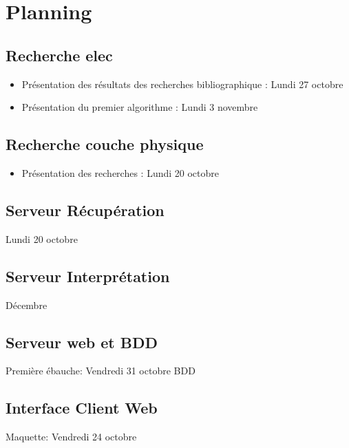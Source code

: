 \documentclass[10pt,a4paper]{article}
\begin{document}
\newpage
\section{Planning}
\subsection{Recherche elec}
\begin{itemize}
	\item Présentation des résultats des recherches bibliographique : Lundi 27 octobre
	\item Présentation du premier algorithme : Lundi 3 novembre
\end{itemize}
\subsection{Recherche couche physique}
\begin{itemize}
	\item Présentation des recherches : Lundi 20 octobre
\end{itemize}
\subsection{Serveur Récupération}
Lundi 20 octobre
\subsection{Serveur Interprétation}
Décembre
\subsection{Serveur web et BDD}
Première ébauche: Vendredi 31 octobre BDD
\subsection{Interface Client Web}
Maquette: Vendredi 24 octobre
\end{document}
